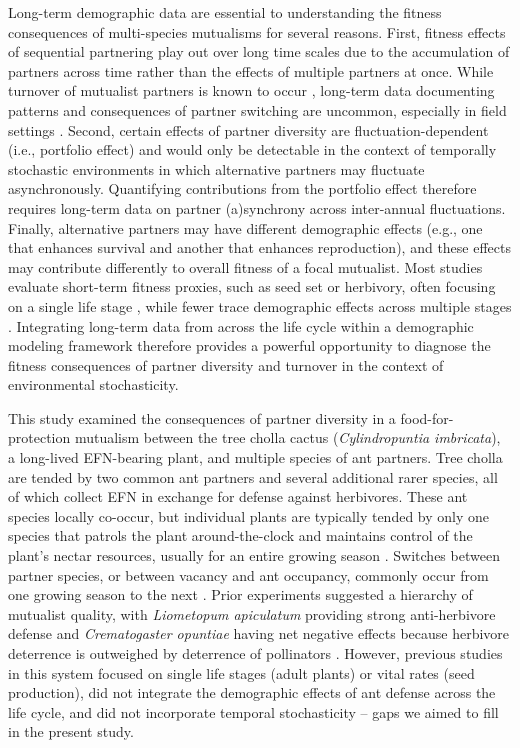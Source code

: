 \documentclass[11pt]{article}
\begin{document}
Long-term demographic data are essential to understanding the fitness consequences of multi-species mutualisms for several reasons. 
First, fitness effects of sequential partnering play out over long time scales due to the accumulation of partners across time rather than the effects of multiple partners at once. 
While turnover of mutualist partners is known to occur \citep{Ness2006, Djieto-Lordon2005,Fonseca2003}, long-term data documenting patterns and consequences of partner switching are uncommon, especially in field settings \citep{Palmer2010}. 
Second, certain effects of partner diversity are fluctuation-dependent (i.e., portfolio effect) and would only be detectable in the context of temporally stochastic environments in which alternative partners may fluctuate asynchronously. 
Quantifying contributions from the portfolio effect therefore requires long-term data on partner (a)synchrony across inter-annual fluctuations. 
Finally, alternative partners may have different demographic effects (e.g., one that enhances survival and another that enhances reproduction), and these effects may contribute differently to overall fitness of a focal mutualist.  
Most studies evaluate short-term fitness proxies, such as seed set or herbivory, often focusing on a single life stage \citep{Palmer2010, Trager2010}, while fewer trace demographic effects across multiple stages \citep{Bruna2014}.
Integrating long-term data from across the life cycle within a demographic modeling framework therefore provides a powerful opportunity to diagnose the fitness consequences of partner diversity and turnover in the context of environmental stochasticity.  
	
This study examined the consequences of partner diversity in a food-for-protection mutualism between the tree cholla cactus (\textit{Cylindropuntia imbricata}), a long-lived EFN-bearing plant, and multiple species of ant partners.
Tree cholla are tended by two common ant partners and several additional rarer species, all of which collect EFN in exchange for defense against herbivores.
These ant species locally co-occur, but individual plants are typically tended by only one species that patrols the plant around-the-clock and maintains control of the plant's nectar resources, usually for an entire growing season \citep{Ohm2014, Donald2022}. 
Switches between partner species, or between vacancy and ant occupancy, commonly occur from one growing season to the next \citep{Miller2007}. 
Prior experiments suggested a hierarchy of mutualist quality, with \textit{Liometopum apiculatum} providing strong anti-herbivore defense and \textit{Crematogaster opuntiae} having net negative effects because herbivore deterrence is outweighed by deterrence of pollinators \citep{Miller2007,Ohm2014}. 
However, previous studies in this system focused on single life stages (adult plants) or vital rates (seed production), did not integrate the demographic effects of ant defense across the life cycle, and did not incorporate temporal stochasticity -- gaps we aimed to fill in the present study. 
\end{document}

